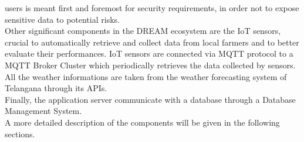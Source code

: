 \documentclass[10pt]{article} %
\begin{document}
users is meant first and foremost for security requirements, in order not to expose sensitive data to potential risks.\\
Other significant components in the DREAM ecosystem are the IoT sensors, crucial to automatically retrieve and collect data from local farmers and to better evaluate their performances.
IoT sensors are connected via MQTT protocol to a MQTT Broker Cluster which periodically retrieves the data collected by sensors.\\
All the weather informations are taken from the weather forecasting system of Telangana through its APIs.\\
Finally, the application server communicate with a database through a Database Management System.\\
A more detailed description of the components will be given in the following sections.
\end{document}

